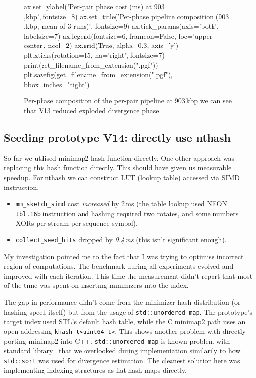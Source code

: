\begin{figure}[H]
\begin{CacheMeCode}
    ax.set_ylabel('Per-pair phase cost (ms) at 903\\,kbp', fontsize=8)
    ax.set_title('Per-phase pipeline composition (903\\,kbp, mean of 3 runs)', fontsize=9)
    ax.tick_params(axis='both', labelsize=7)
    ax.legend(fontsize=6, frameon=False, loc='upper center', ncol=2)
    ax.grid(True, alpha=0.3, axis='y')
    plt.xticks(rotation=15, ha='right', fontsize=7)
    print(get_filename_from_extension(".pgf"))
    plt.savefig(get_filename_from_extension(".pgf"), bbox_inches="tight")
  \end{CacheMeCode}
  \caption{Per-phase composition of the per-pair pipeline at
    903\,kbp we can see that V13 reduced exploded divergence phase}
  \label{fig:phase-stack-v13}
\end{figure}
\vspace{.35\baselineskip}

\subsection{Seeding prototype V14: directly use nthash}

So far we utilised minimap2 hash function directly. One other approach was replacing this hash function directly. This should have given us measurable speedup. For nthash we can construct LUT (lookup table) accessed via SIMD instruction.

\begin{itemize}
\item \texttt{mm\_sketch\_simd} cost \emph{increased} by 2\,ms
  (the table lookup used NEON \texttt{tbl.16b} instruction and hashing required two rotates, and
  some numbers XORs per stream per sequence symbol).
\item \texttt{collect\_seed\_hits} dropped by \emph{0.4\,ms} (this isn't significant enough).
\end{itemize}

My investigation pointed me to the fact that I was trying to optimise incorrect region of computations. The benchmark during all experiments evolved and improved with each iteration. This time the measurement didn't report that
most of the time was spent on inserting minimizers into the index.

The gap in performance didn't come from the minimizer hash distribution (or hashing speed itself) but from the usage of \texttt{std::unordered\_map}.
The prototype's target index used STL's default hash table, while the C minimap2 path uses an open-addressing
\texttt{khash\_t<uint64\_t>}. This shows another problem with directly porting minimap2 into C++. \texttt{std::unordered\_map} is known problem with standard library~\autocite{stack_overflow_answer_cpp_maps} that we overlooked during implementation similarily to how \texttt{std::sort} was used for divergence estimation.
The cleanest solution here was implementing indexing structures as flat hash maps directly.

